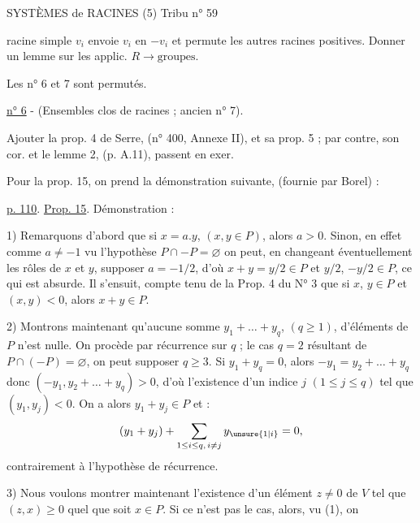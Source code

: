 SYSTÈMES de RACINES (5) \hfill Tribu n° 59

racine simple $v_i$ envoie $v_i$ en $-v_i$ et permute les autres racines positives. Donner un lemme sur les applic. $R\longrightarrow\text{groupes}$.

Les n° 6 et 7 sont permutés.

\uline{n° 6} - (Ensembles clos de racines ; ancien n° 7).

Ajouter la prop. 4 de Serre, (n° 400, Annexe II), et sa prop. 5 ; par contre, son cor. et le lemme 2, (p. A.11), passent en exer.

Pour la prop. 15, on prend la démonstration suivante, (fournie par Borel) :

\uline{p. 110}. \uline{Prop. 15}. Démonstration :

1) Remarquons d'abord que si $x=a.y$, $(x,y\in P)$, alors $a>0$. Sinon, en effet comme $a\ne-1$ vu l'hypothèse $P\cap-P=\varnothing$ on peut, en changeant éventuellement les rôles de $x$ et $y$, supposer $a=-1/2$, d'où $x+y=y/2\in P$ et $y/2$, $-y/2\in P$, ce qui est absurde. Il s'ensuit, compte tenu de la Prop. 4 du N° 3 que si $x$, $y\in P$ et $(x,y)<0$, alors $x+y\in P$.

2) Montrons maintenant qu'aucune somme $y_1+\ldots+y_q$, $(q\geq1)$, d'éléments de $P$ n'est nulle. On procède par récurrence sur $q$ ; le cas $q=2$ résultant de $P\cap(-P)=\varnothing$, on peut supposer $q\geq3$. Si $y_1+y_q=0$, alors $-y_1=y_2+\ldots+y_q$ donc $(-y_1,y_2+\ldots+y_q)>0$, d'où l'existence d'un indice $j$ $(1\leq j\leq q)$ tel que $(y_1,y_j)<0$. On a alors $y_1+y_j\in P$ et :
\[
 (y_1+y_j)+\sum_{1\leq i\leq q,\,i\ne j}y_{\unsure{1|i}}=0,
\]
contrairement à l'hypothèse de récurrence.

3) Nous voulons montrer maintenant l'existence d'un élément $z\ne0$ de $V$ tel que $(z,x)\geq0$ quel que soit $x\in P$. Si ce n'est pas le cas, alors, vu (1), on

